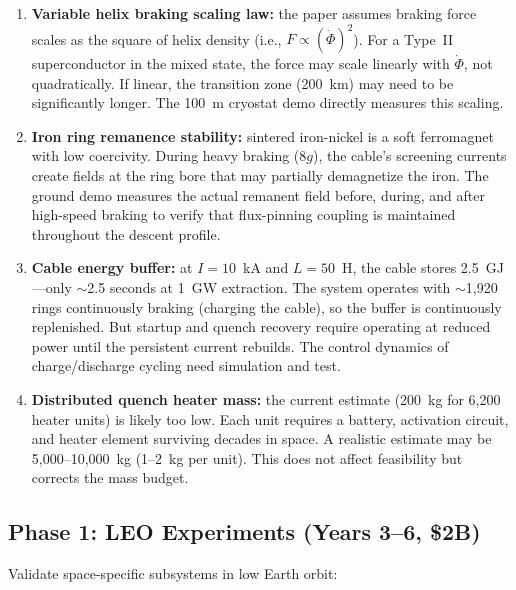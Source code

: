 \documentclass[12pt,letterpaper]{article}
\begin{document}
\begin{enumerate}[label=(\roman*)]
\item \textbf{Variable helix braking scaling law:} the paper assumes braking force scales as the square of helix density (i.e., $F \propto (\dot{\Phi})^2$). For a Type~II superconductor in the mixed state, the force may scale linearly with $\dot{\Phi}$, not quadratically. If linear, the transition zone (200~km) may need to be significantly longer. The 100~m cryostat demo directly measures this scaling.

\item \textbf{Iron ring remanence stability:} sintered iron-nickel is a soft ferromagnet with low coercivity. During heavy braking (8$g$), the cable's screening currents create fields at the ring bore that may partially demagnetize the iron. The ground demo measures the actual remanent field before, during, and after high-speed braking to verify that flux-pinning coupling is maintained throughout the descent profile.

\item \textbf{Cable energy buffer:} at $I = 10$~kA and $L = 50$~H, the cable stores 2.5~GJ---only $\sim$2.5 seconds at 1~GW extraction. The system operates with ${\sim}$1{,}920 rings continuously braking (charging the cable), so the buffer is continuously replenished. But startup and quench recovery require operating at reduced power until the persistent current rebuilds. The control dynamics of charge/discharge cycling need simulation and test.

\item \textbf{Distributed quench heater mass:} the current estimate (200~kg for 6,200 heater units) is likely too low. Each unit requires a battery, activation circuit, and heater element surviving decades in space. A realistic estimate may be 5,000--10,000~kg (1--2~kg per unit). This does not affect feasibility but corrects the mass budget.
\end{enumerate}

\subsection{Phase 1: LEO Experiments (Years 3--6, \$2B)}

Validate space-specific subsystems in low Earth orbit:
\end{document}

